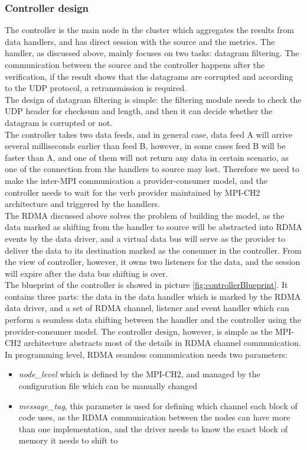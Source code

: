 \documentclass[11pt,openright,a4paper]{report}
\begin{document}
\subsubsection{Controller design}
The controller is the main node in the cluster which aggregates the results from data handlers, and has direct session with the source and the metrics. The handler, as discussed above, mainly focuses on two tasks: datagram filtering. The communication between the source and the controller happens after the verification, if the result shows that the datagrams are corrupted and according to the UDP protocol, a retransmission is required.\\
The design of datagram filtering is simple: the filtering module needs to check the UDP header for checksum and length, and then it can decide whether the datagram is corrupted or not.\\
The controller takes two data feeds, and in general case, data feed A will arrive several milliseconds earlier than feed B, however, in some cases feed B will be faster than A, and one of them will not return any data in certain scenario, as one of the connection from the handlers to source may lost. Therefore we need to make the inter-MPI communication a provider-consumer model, and the controller needs to wait for the verb provider maintained by MPI-CH2 architecture and triggered by the handlers.\\
The RDMA discussed above solves the problem of building the model, as the data marked as shifting from the handler to source will be abstracted into RDMA events by the data driver, and a virtual data bus will serve as the provider to deliver the data to its destination marked as the consumer in the controller. From the view of controller, however, it owns two listeners for the data, and the session will expire after the data bus shifting is over. \\
The blueprint of the controller is showed in picture \ref{fig:controllerBlueprint}. It contains three parts: the data in the data handler which is marked by the RDMA data driver, and a set of RDMA channel, listener and event handler which can perform a seamless data shifting between the handler and the controller using the provider-consumer model. The controller design, however, is simple as the MPI-CH2 architecture abstracts most of the details in RDMA channel communication.\\
In programming level, RDMA seamless communication needs two parameters:
\begin{itemize}
	\item \textit{node\_level} which is defined by the MPI-CH2, and managed by the configuration file which can be manually changed
	\item \textit{message\_tag}, this parameter is used for defining which channel each block of code uses, as the RDMA communication between the nodes can have more than one implementation, and the driver needs to know the exact block of memory it needs to shift to
\end{itemize}
\end{document}
